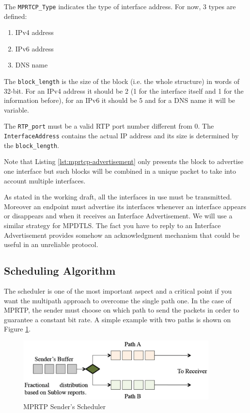 The \texttt{MPRTCP\_Type} indicates the type of interface address. For now, 3 types are defined: 
\begin{enumerate}
\item IPv4 address
\item IPv6 address
\item DNS name
\end{enumerate}

The \texttt{block\_length} is the size of the block (i.e. the whole structure) in words of 32-bit. For an IPv4 address it should be 2 (1 for the interface itself and 1 for the information before), for an IPv6 it should be 5 and for a DNS name it will be variable.

The \texttt{RTP\_port} must be a valid RTP port number different from 0. The \texttt{InterfaceAddress} contains the actual IP address and its size is determined by the \texttt{block\_length}.

Note that Listing \ref{lst:mprtcp-advertisement} only presents the block to advertise one interface but such blocks will be combined in a unique packet to take into account multiple interfaces.

As stated in the working draft, all the interfaces in use must be transmitted. Moreover an endpoint must advertise its interfaces whenever an interface appears or disappears and when it receives an Interface Advertisement. We will use a similar strategy for MPDTLS. The fact you have to reply to an Interface Advertisement provides somehow an acknowledgment mechanism that could be useful in an unreliable protocol.

\subsection{Scheduling Algorithm}

The scheduler is one of the most important aspect and a critical point if you want the multipath approach to overcome the single path one. In the case of MPRTP, the sender must choose on which path to send the packets in order to guarantee a constant bit rate. A simple example with two paths is shown on Figure \ref{fig:mprtp-scheduler}.

\begin{figure}[!h]
\centering
\includegraphics[width=0.9\textwidth]{images/mprtp-scheduler}
\caption{MPRTP Sender's Scheduler}
\label{fig:mprtp-scheduler}
\end{figure}


